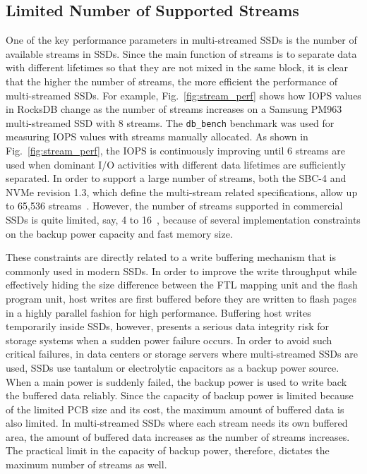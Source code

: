\subsection{Limited Number of Supported Streams}
One of the key performance parameters in multi-streamed SSDs is the number of 
available streams in SSDs.  
Since the main function of  streams is to separate data with different lifetimes 
so that they are not mixed in the same block, it is clear that the 
higher the number of streams, the more efficient the performance of multi-streamed SSDs.
{\color{blue}
For example, Fig.~\ref{fig:stream_perf} shows how IOPS values in RocksDB
change as the number of streams increases on a Samsung PM963 multi-streamed SSD
with 8 streams.
The \texttt{db\_bench} benchmark was used for measuring IOPS values with streams
manually allocated.
As shown in Fig.~\ref{fig:stream_perf}, the IOPS is continuously improving
until 6 streams are used when dominant I/O activities with different data lifetimes
are sufficiently separated.
}
In order to support a large number of streams, both the SBC-4 and NVMe revision 1.3, which define the 
multi-stream related specifications, allow up to 65,536 streams~\cite{T10, NVMe}.  
However, the number of streams supported in
commercial SSDs is quite limited, say, 4 to 16~\cite{MultiStream, Level, AutoStream}, 
because of several implementation constraints on the backup power capacity and fast memory size.

These constraints are directly related to a write buffering mechanism that is 
commonly used in modern SSDs.   In order to improve the write throughput while 
effectively hiding the size difference
between the FTL mapping unit and the flash program unit, host writes are first buffered 
before they are written to flash pages in a highly parallel fashion for high performance.  
Buffering host writes temporarily inside SSDs, however, presents a serious data integrity 
risk for storage systems when a sudden power failure occurs.  
In order to avoid such critical failures, in data centers or storage servers 
where multi-streamed SSDs are used,
SSDs use tantalum or electrolytic capacitors as a backup power source.  
When a main power is suddenly failed, the backup power is used to write back the
buffered data reliably.  
Since the capacity of backup power is limited because of the limited PCB size and 
its cost, the maximum amount of buffered data is also limited.  
In multi-streamed SSDs where
each stream needs its own buffered area, the amount of buffered data increases 
as the number of streams increases.  
The practical limit in the capacity of backup power, therefore, dictates the maximum
number of streams as well.

